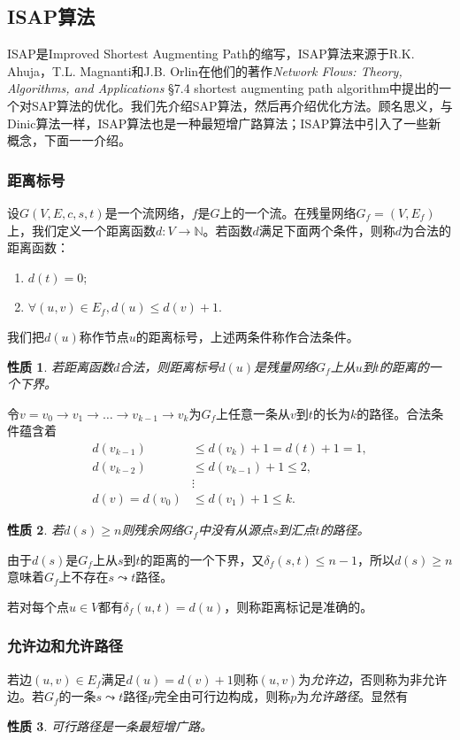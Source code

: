 \documentclass{ctexbook}
\newtheorem{property}{性质}[chapter]
\begin{document}

  \subsection{ISAP算法}
  ISAP是Improved Shortest Augmenting Path的缩写，ISAP算法来源于R.K. Ahuja，T.L. Magnanti和J.B. Orlin在他们的著作\emph{Network Flows: Theory, Algorithms, and Applications} \S7.4 shortest augmenting path algorithm中提出的一个对SAP算法的优化。我们先介绍SAP算法，然后再介绍优化方法。顾名思义，与Dinic算法一样，ISAP算法也是一种最短增广路算法；ISAP算法中引入了一些新概念，下面一一介绍。
  \subsubsection*{距离标号}
  设$G(V,E,c,s,t)$是一个流网络，$f$是$G$上的一个流。在残量网络$G_f=(V,E_f)$上，我们定义一个距离函数$d\colon V\to\mathbb{N}$。若函数$d$满足下面两个条件，则称$d$为合法的距离函数：
  \begin{enumerate}
      \item $d(t) = 0$;
      \item $\forall (u,v)\in E_f, d(u) \le d(v) +1$.
  \end{enumerate}
  我们把$d(u)$称作节点$u$的距离标号，上述两条件称作合法条件。
  \begin{property}\label{P:lower_bound}
      若距离函数$d$合法，则距离标号$d(u)$是残量网络$G_f$上从$u$到$t$的距离的一个下界。
  \end{property}
  令$v=v_0\to v_1 \to\dots\to v_{k-1}\to v_k$为$G_f$上任意一条从$v$到$t$的长为$k$的路径。合法条件蕴含着
  \begin{align*}
      d(v_{k-1})&\le d(v_k)+1 = d(t)+1=1,\\
      d(v_{k-2})&\le d(v_{k-1})+1\le 2,\\
       &\vdots\\
      d(v) = d(v_0)&\le d(v_1) + 1 \le k.
  \end{align*}
  \begin{property}
      若$d(s)\ge n$则残余网络$G_f$中没有从源点$s$到汇点$t$的路径。
  \end{property}
  由于$d(s)$是$G_f$上从$s$到$t$的距离的一个下界，又$\delta_f(s,t)\le n-1$，所以$d(s)\ge n$意味着$G_f$上不存在$s\leadsto t$路径。

  若对每个点$u\in V$都有$\delta_f(u,t)=d(u)$，则称距离标记是准确的。
  \subsubsection*{允许边和允许路径}
  若边$(u,v)\in E_f$满足$d(u)=d(v)+1$则称$(u,v)$为\emph{允许边}，否则称为非允许边。若$G_f$的一条$s\leadsto t$路径$p$完全由可行边构成，则称$p$为\emph{允许路径}。显然有
  \begin{property}
    可行路径是一条最短增广路。
  \end{property}
\end{document}
